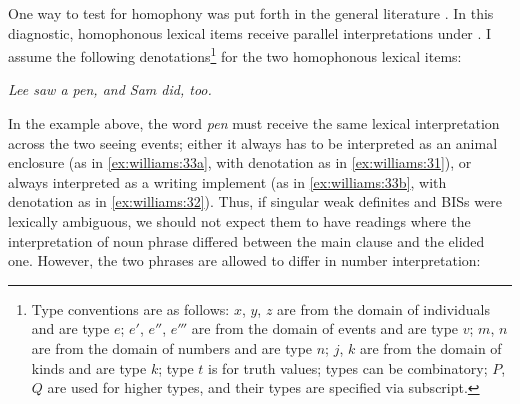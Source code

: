 \documentclass[output=paper,
modfonts
]{langscibook}
\begin{document}
One way to test for homophony was put forth in the general  literature \citep{RullmannYou2006,wilhelm2008}. In this diagnostic, homophonous lexical items receive parallel interpretations under . I assume the following denotations\footnote{Type conventions are as follows: $x$, $y$, $z$ are from the domain of individuals and are type $e$; $e'$, $e''$, $e'''$ are from the domain of events and are type $v$; $m$, $n$ are from the domain of numbers and are type $n$; $j$, $k$ are from the domain of kinds and are type $k$; type $t$ is for truth values; types can be combinatory; $P$, $Q$ are used for higher types, and their types are specified via subscript.} for the two homophonous lexical items: 

\begin{exe}
\end{exe}

\begin{exe}
	\ex \label{ex:williams:33}
	\textit{Lee saw a pen, and Sam did, too.}
	\begin{xlist}
	\end{xlist}
\end{exe} 

In the example above, the word \textit{pen} must receive the same lexical interpretation across the two seeing events; either it always has to be interpreted as an animal enclosure (as in \ref{ex:williams:33a}, with denotation as in \ref{ex:williams:31}), or always interpreted as a writing implement (as in \ref{ex:williams:33b}, with denotation as in \ref{ex:williams:32}). Thus, if singular weak definites and BISs were lexically ambiguous, we should not expect them to have readings where the  interpretation of noun phrase differed between the main clause and the elided one. However, the two phrases are allowed to differ in number interpretation:
\end{document}
